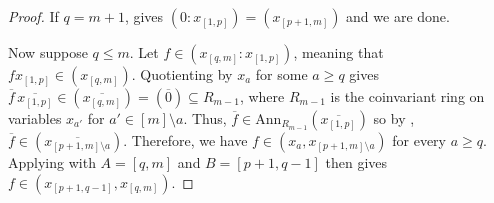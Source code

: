 \begin{proof}
If $q=m+1$, 
 gives $(0:x_{[1,p]})=(x_{[p+1,m]})$ and we are done.

Now suppose $q\leq m$.
Let $f \in (x_{[q,m]}:x_{[1,p]})$, meaning that $fx_{[1,p]}\in (x_{[q,m]})$.
Quotienting by $x_a$ for some $a\geq q$ gives $\overline{f}\,\overline{x_{[1,p]}}\in (\overline{x_{[q,m]}}) =(\overline{0}) \subseteq R_{m-1}$, where $R_{m-1}$ is the coinvariant ring on variables $x_{a'}$ for $a'\in [m]\setminus a$. Thus, $\overline{f}\in \mathrm{Ann}_{R_{m-1}}(\overline{x_{[1,p]}})$
so by ,
$\overline{f}\in(\overline{x_{[p+1,m]\setminus a}})$. Therefore, we have $f\in(x_a,x_{[p+1,m]\setminus a})$
for every $a\geq q$.  Applying  with $A = [q,m]$ and $B = [p+1,q-1]$ then gives
$f\in(x_{[p+1,q-1]},x_{[q,m]})$.
\end{proof}

